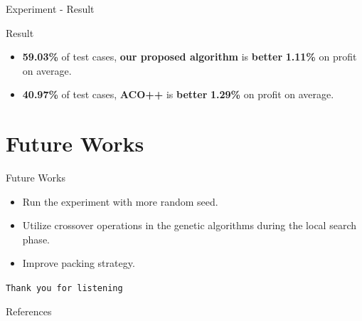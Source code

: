 \documentclass[aspectratio=169]{beamer}
\begin{document}
\begin{frame}{Experiment - Result}
\begin{block} {Result}
\begin{itemize}
    \vspace{0.2cm}
    \item \color{red} \textbf{59.03\%} \color{black} of test cases, \color{red} \textbf{our proposed algorithm} \color{black} is \color{red} \textbf{better} \textbf{1.11\%} \color{black} on profit on average.
    \vspace{0.2cm}
    \item \textbf{40.97\%} of test cases, \textbf{ACO++} is \textbf{better} \textbf{1.29\%} on profit on average.
    \vspace{0.2cm}
\end{itemize}
\end{block}
\end{frame}

\section{Future Works}
\begin{frame}{Future Works}
\begin{block} {}
\begin{itemize}
    \vspace{0.2cm}
    \item Run the experiment with more random seed.
    \pause
    \vspace{0.2cm}
    \item Utilize crossover operations in the genetic algorithms during the local search phase.
    \pause
    \vspace{0.2cm}
    \item Improve packing strategy.
    \vspace{0.2cm}
\end{itemize}
\end{block}
\end{frame}

\begin{frame}
\begin{center}
    \Huge \texttt{Thank you for listening}
\end{center}
\end{frame}

\begin{frame}{References}
\text{[1]} \\
\text{[2]} \\
\text{[3]} \\
\text{[4]} \\
\text{[5]}  \\
\text{[6]} 
\end{frame}
\end{document}
